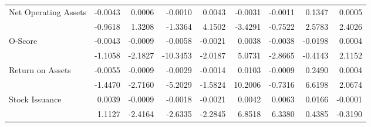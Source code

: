\begin{sidewaystable}[htbp]
{\begin{tabular}{@{}lrrrrrrrr@{}}
\multirow{2}{*}{Net Operating Assets} & -0.0043 & 0.0006 & -0.0010 & 0.0043 & -0.0031 & -0.0011 & 0.1347 & 0.0005 \\
& -0.9618 & 1.3208 & -1.3364 & 4.1502 & -3.4291 & -0.7522 & 2.5783 & 2.4026 \\
\multirow{2}{*}{O-Score} & -0.0043 & -0.0009 & -0.0058 & -0.0021 & 0.0038 & -0.0038 & -0.0198 & 0.0004 \\
& -1.1058 & -2.1827 & -10.3453 & -2.0187 & 5.0731 & -2.8665 & -0.4143 & 2.1152 \\
\multirow{2}{*}{Return on Assets} & -0.0055 & -0.0009 & -0.0029 & -0.0014 & 0.0103 & -0.0009 & 0.2490 & 0.0004 \\
& -1.4470 & -2.7160 & -5.2029 & -1.5824 & 10.2006 & -0.7316 & 6.6198 & 2.0674 \\
\multirow{2}{*}{Stock Issuance} & 0.0039 & -0.0009 & -0.0018 & -0.0021 & 0.0042 & 0.0063 & 0.0166 & -0.0001 \\
& 1.1127 & -2.4164 & -2.6335 & -2.2845 & 6.8518 & 6.3380 & 0.4385 & -0.3190 \\ \bottomrule
\end{tabular}%
}
\end{sidewaystable}
